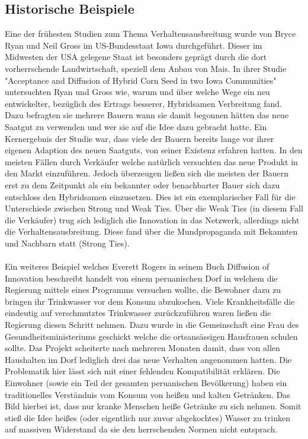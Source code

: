 \documentclass[12pt]{article}
\begin{document}
\subsection{Historische Beispiele}
Eine der frühesten Studien zum Thema Verhaltensausbreitung wurde von Bryce Ryan und Neil Gross im US-Bundesstaat Iowa durchgeführt. Dieser im Midwesten der USA gelegene Staat ist besonders geprägt durch die dort vorherrschende Landwirtschaft, speziell dem Anbau von Mais. In ihrer Studie "Acceptance and Diffusion of Hybrid Corn Seed in two Iowa Communities" untersuchten Ryan und Gross wie, warum und über welche Wege ein neu entwickelter, bezüglich des Ertrags besserer, Hybridsamen Verbreitung fand. Dazu befragten sie mehrere Bauern wann sie damit begonnen hätten das neue Saatgut zu verwenden und wer sie auf die Idee dazu gebracht hatte. Ein Kernergebnis der Studie war, dass viele der Bauern bereits lange vor ihrer eigenen Adaption des neuen Saatguts, von seiner Existenz erfahren hatten. In den meisten Fällen durch Verkäufer welche natürlich versuchten das neue Produkt in den Markt einzuführen. Jedoch überzeugen ließen sich die meisten der Bauern erst zu dem Zeitpunkt als ein bekannter oder benachbarter Bauer sich dazu entschloss den Hybridsamen einzusetzen. Dies ist ein exemplarischer Fall für die Unterschiede zwischen Strong und Weak Ties. Über die Weak Ties (in diesem Fall die Verkäufer) trug sich lediglich die Innovation in das Netzwerk, allerdings nicht die Verhaltensausbreitung. Diese fand über die Mundpropaganda mit Bekannten und Nachbarn statt (Strong Ties). \\\\
Ein weiteres Beispiel welches Everett Rogers in seinem Buch Diffusion of Innovation beschreibt handelt von einem peruanischen Dorf in welchem die Regierung mittels eines Programms versuchen wollte, die Bewohner dazu zu bringen ihr Trinkwasser vor dem Konsum abzukochen. Viele Krankheitsfälle die eindeutig auf verschmutztes Trinkwasser zurückzuführen waren ließen die Regierung diesen Schritt nehmen. Dazu wurde in die Gemeinschaft eine Frau des Gesundheitsministeriums geschickt welche die ortsansässigen Hausfrauen schulen sollte. Das Projekt scheiterte nach mehreren Monaten damit, dass von allen Haushalten im Dorf lediglich drei das neue Verhalten angenommen hatten. Die Problematik hier lässt sich mit einer fehlenden Kompatibilität erklären. Die Einwohner (sowie ein Teil der gesamten peruanischen Bevölkerung) haben ein traditionelles Verständnis vom Konsum von heißen und kalten Getränken. Das Bild hierbei ist, dass nur kranke Menschen heiße Getränke zu sich nehmen. Somit stieß die Idee heißes (oder eigentlich nur zuvor abgekochtes) Wasser zu trinken auf massiven Widerstand da sie den herrschenden Normen nicht entsprach.
\end{document}
